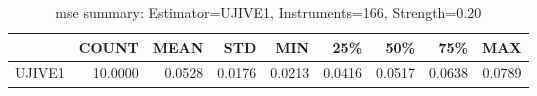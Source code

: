 \begin{table}[ht]
\centering
\caption{mse summary: Estimator=UJIVE1, Instruments=166, Strength=0.20}
\begin{tabular}{lrrrrrrrr}
\toprule
 & COUNT & MEAN & STD & MIN & 25\% & 50\% & 75\% & MAX \\
\midrule
UJIVE1 & 10.0000 & 0.0528 & 0.0176 & 0.0213 & 0.0416 & 0.0517 & 0.0638 & 0.0789 \\
\bottomrule
\end{tabular}
\end{table}
